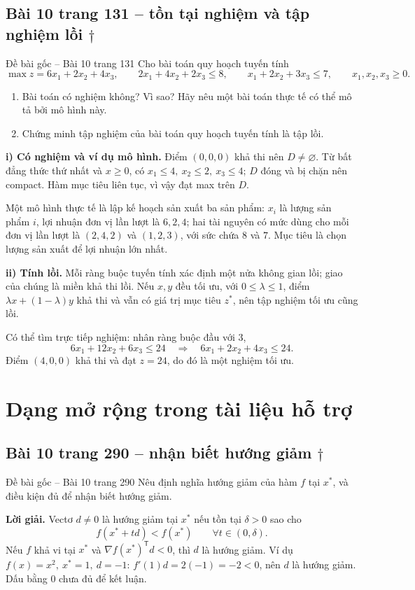 \documentclass[11pt,a4paper]{article}
\newcommand{\grad}{\nabla}
\newcommand{\T}{^{\mathsf T}}
\begin{document}
\clearpage
\subsection{Bài 10 trang 131 -- tồn tại nghiệm và tập nghiệm lồi \(\dagger\)}
\begin{questionbox}{Đề bài gốc -- Bài 10 trang 131}
Cho bài toán quy hoạch tuyến tính
\[
\max z=6x_1+2x_2+4x_3,\qquad
2x_1+4x_2+2x_3\le8,\qquad
x_1+2x_2+3x_3\le7,\qquad x_1,x_2,x_3\ge0.
\]
\begin{enumerate}[label=\roman*),nosep,leftmargin=*]
\item Bài toán có nghiệm không? Vì sao? Hãy nêu một bài toán thực tế có thể mô tả bởi mô hình này.
\item Chứng minh tập nghiệm của bài toán quy hoạch tuyến tính là tập lồi.
\end{enumerate}
\end{questionbox}
\textbf{i) Có nghiệm và ví dụ mô hình.} Điểm \((0,0,0)\) khả thi nên \(D\ne\varnothing\). Từ bất đẳng thức thứ nhất và \(x\ge0\), có \(x_1\le4,\ x_2\le2,\ x_3\le4\); \(D\) đóng và bị chặn nên compact. Hàm mục tiêu liên tục, vì vậy đạt max trên \(D\).

Một mô hình thực tế là lập kế hoạch sản xuất ba sản phẩm: \(x_i\) là lượng sản phẩm \(i\), lợi nhuận đơn vị lần lượt là \(6,2,4\); hai tài nguyên có mức dùng cho mỗi đơn vị lần lượt là \((2,4,2)\) và \((1,2,3)\), với sức chứa \(8\) và \(7\). Mục tiêu là chọn lượng sản xuất để lợi nhuận lớn nhất.

\textbf{ii) Tính lồi.} Mỗi ràng buộc tuyến tính xác định một nửa không gian lồi; giao của chúng là miền khả thi lồi. Nếu \(x,y\) đều tối ưu, với \(0\le\lambda\le1\), điểm \(\lambda x+(1-\lambda)y\) khả thi và vẫn có giá trị mục tiêu \(z^\ast\), nên tập nghiệm tối ưu cũng lồi.

Có thể tìm trực tiếp nghiệm: nhân ràng buộc đầu với \(3\),
\[
6x_1+12x_2+6x_3\le24
\quad\Longrightarrow\quad
6x_1+2x_2+4x_3\le24.
\]
Điểm \((4,0,0)\) khả thi và đạt \(z=24\), do đó là một nghiệm tối ưu.


\section{Dạng mở rộng trong tài liệu hỗ trợ}
\clearpage
\subsection{Bài 10 trang 290 -- nhận biết hướng giảm \(\dagger\)}
\begin{questionbox}{Đề bài gốc -- Bài 10 trang 290}
Nêu định nghĩa hướng giảm của hàm \(f\) tại \(x^\ast\), và điều kiện đủ để nhận biết hướng giảm.
\end{questionbox}
\textbf{Lời giải.} Vectơ \(d\ne0\) là hướng giảm tại \(x^\ast\) nếu tồn tại \(\delta>0\) sao cho
\[
f(x^\ast+td)<f(x^\ast)\qquad\forall t\in(0,\delta).
\]
Nếu \(f\) khả vi tại \(x^\ast\) và \(\grad f(x^\ast)\T d<0\), thì \(d\) là hướng giảm. Ví dụ \(f(x)=x^2,\ x^\ast=1,\ d=-1\): \(f'(1)d=2(-1)=-2<0\), nên \(d\) là hướng giảm. Dấu bằng \(0\) chưa đủ để kết luận.
\end{document}
